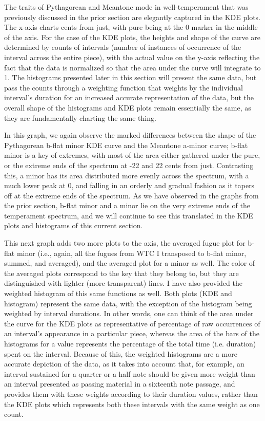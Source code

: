     The traits of Pythagorean and Meantone mode in well-temperament that was
previously discussed in the prior section are elegantly captured in the
KDE plots. The x-axis charts cents from just, with pure being at the 0
marker in the middle of the axis. For the case of the KDE plots, the
heights and shape of the curve are determined by counts of intervals
(number of instances of occurrence of the interval across the entire
piece), with the actual value on the y-axis reflecting the fact that the
data is normalized so that the area under the curve will integrate to 1.
The histograms presented later in this section will present the same
data, but pass the counts through a weighting function that weights by
the individual interval's duration for an increased accurate
representation of the data, but the overall shape of the histograms and
KDE plots remain essentially the same, as they are fundamentally
charting the same thing.

In this graph, we again observe the marked differences between the shape
of the Pythagorean b-flat minor KDE curve and the Meantone a-minor
curve; b-flat minor is a key of extremes, with most of the area either
gathered under the pure, or the extreme ends of the spectrum at -22 and
22 cents from just. Contrasting this, a minor has its area distributed
more evenly across the spectrum, with a much lower peak at 0, and
falling in an orderly and gradual fashion as it tapers off at the
extreme ends of the spectrum. As we have observed in the graphs from the
prior section, b-flat minor and a minor lie on the very extreme ends of
the temperament spectrum, and we will continue to see this translated in
the KDE plots and histograms of this current section.

This next graph adds two more plots to the axis, the averaged fugue plot
for b-flat minor (i.e., again, all the fugues from WTC I transposed to
b-flat minor, summed, and averaged), and the averaged plot for a minor
as well. The color of the averaged plots correspond to the key that they
belong to, but they are distinguished with lighter (more transparent)
lines. I have also provided the weighted histogram of this same
functions as well. Both plots (KDE and histogram) represent the same
data, with the exception of the histogram being weighted by interval
durations. In other words, one can think of the area under the curve for
the KDE plots as representative of percentage of raw occurrences of an
interval's appearance in a particular piece, whereas the area of the
bars of the histograms for a value represents the percentage of the
total time (i.e. duration) spent on the interval. Because of this, the
weighted histograms are a more accurate depiction of the data, as it
takes into account that, for example, an interval sustained for a
quarter or a half note should be given more weight than an interval
presented as passing material in a sixteenth note passage, and provides
them with these weights according to their duration values, rather than
the KDE plots which represents both these intervals with the same weight
as one count.

